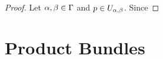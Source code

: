 \documentclass{book}
\begin{document}
	\begin{proof}
		Let $\alpha, \beta \in \Gamma$ and $p \in U_{\alpha, \beta}$. Since 
	\end{proof}

	
	
	









	
	
	
	
	
	
	
	
	
	
	
	

	
	
	
	
	
	
	
	
	
	
	
	
	
	
	
	
	
	
	
	
	
	
	
	
	
	
	
	
	

	
	
	











	
	
	
	
	
	
	
	
	
	
	
	
	
	
	
	
	
	
	
	
	
	
	
	
	
	
	
	
	
	
	
		\newpage
	\section{Product Bundles}
	
\end{document}
